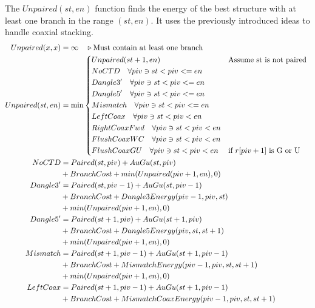 \documentclass{cshonours}
\begin{document}
The $Unpaired(st, en)$ function finds the energy of the best structure with at least one branch in the range $(st, en)$. It uses the previously introduced ideas to handle coaxial stacking.
\begin{align*}
Unpaired(x, x) &= \infty \quad \triangleright \text{Must contain at least one branch} \\
Unpaired(st, en) &= \min{\begin{dcases*}
  Unpaired(st + 1, en) & Assume st is not paired \\
  NoCTD \quad \forall piv \ni st < piv <= en \\
  Dangle3' \quad \forall piv \ni st < piv <= en \\
  Dangle5' \quad \forall piv \ni st < piv <= en \\
  Mismatch \quad \forall piv \ni st < piv <= en \\
  LeftCoax \quad \forall piv \ni st < piv < en \\
  RightCoaxFwd \quad \forall piv \ni st < piv < en \\
  FlushCoaxWC \quad \forall piv \ni st < piv < en \\
  FlushCoaxGU \quad \forall piv \ni st < piv < en & if $r[piv + 1]$ is G or U \\
\end{dcases*}} \\
NoCTD &= Paired(st, piv) + AuGu(st, piv) \\
  &+ BranchCost + min(Unpaired(piv + 1, en), 0) \\
Dangle3' &= Paired(st, piv - 1) + AuGu(st, piv - 1) \\
  & + BranchCost + Dangle3Energy(piv - 1, piv, st) \\
  & + min(Unpaired(piv + 1, en), 0) \\
Dangle5' &= Paired(st + 1, piv) + AuGu(st + 1, piv) \\
  & + BranchCost + Dangle5Energy(piv, st, st + 1) \\
  & + min(Unpaired(piv + 1, en), 0) \\
Mismatch &= Paired(st + 1, piv - 1) + AuGu(st + 1, piv - 1) \\
  & + BranchCost + MismatchEnergy(piv - 1, piv, st, st + 1) \\
  & + min(Unpaired(piv + 1, en), 0) \\
LeftCoax &= Paired(st + 1, piv - 1) + AuGu(st + 1, piv - 1) \\
  & + BranchCost + MismatchCoaxEnergy(piv - 1, piv, st, st + 1) \\

\end{align*}
\end{document}
